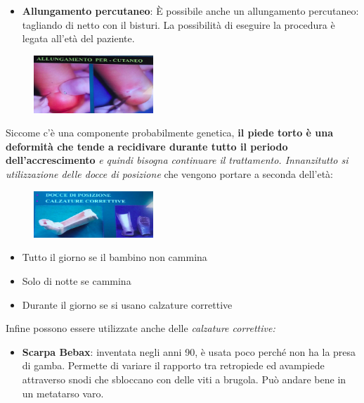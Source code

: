 \begin{itemize}
\begin{itemize}
\begin{itemize}
\item
  \textbf{Allungamento percutaneo}: È possibile anche un allungamento percutaneo: tagliando di netto con il bisturi. La possibilità di eseguire la procedura è legata all'età del paziente.
	\end{itemize}
\end{itemize}

\begin{figure}[!ht]
\centering
\includegraphics[width=0.4\textwidth]{016/image23.png}
\end{figure}

Siccome c'è una componente probabilmente genetica, \textbf{il piede torto è una deformità che tende a recidivare durante tutto il periodo dell'accrescimento} \emph{e quindi bisogna continuare il trattamento.
Innanzitutto si utilizzazione delle \emph{docce di posizione }}che vengono portare a seconda dell'età:

\begin{figure}[!ht]
\centering
\includegraphics[width=0.4\textwidth]{016/image24.png}
\end{figure}

\begin{itemize}
\item
  Tutto il giorno se il bambino non cammina
\item
  Solo di notte se cammina
\item
  Durante il giorno se si usano calzature correttive
\end{itemize}

Infine possono essere utilizzate anche delle \emph{calzature correttive:}

\begin{itemize}
\item
  \textbf{Scarpa Bebax}: inventata negli anni 90, è usata poco perché non ha la presa di gamba. Permette di variare il rapporto tra retropiede ed avampiede attraverso snodi che sbloccano con delle viti a brugola. Può andare bene in un metatarso varo.


\end{itemize}
\end{itemize}
